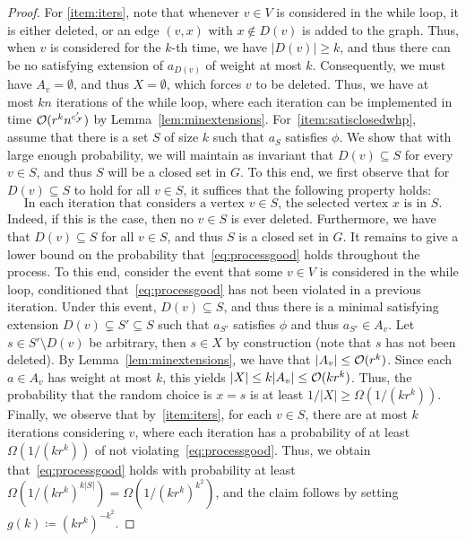 \documentclass[10pt,a4paper]{article}
\theoremstyle{plain}
\newcommand{\Oh}{{\cal O}}
\newcommand{\confam}{\mathcal{F}}
\begin{document}
\begin{proof}
For \ref{item:iters}, note that whenever $v\in V$ is considered in the while loop, it is either deleted, or an edge $(v,x)$ with $x\notin D(v)$ is added to the graph. Thus, when $v$ is considered for the $k$-th time, we have $|D(v)|\ge k$, and thus there can be no satisfying extension of $a_{D(v)}$ of weight at most $k$. Consequently, we must have $A_v=\emptyset$, and thus $X=\emptyset$, which forces $v$ to be deleted. Thus, we have at most $kn$ iterations of the while loop, where each iteration can be implemented in time $\Oh(r^k n^{c'_\confam})$ by Lemma~\ref{lem:minextensions}.
%
For~\ref{item:satisclosedwhp}, assume that there is a set $S$ of size $k$ such that $a_S$ satisfies $\phi$. We show that with large enough probability, we will maintain as invariant that $D(v)\subseteq S$ for every $v\in S$, and thus $S$ will be a closed set in $G$. To this end, we first observe that for $D(v) \subseteq S$ to hold for all $v\in S$, it suffices that the following property holds:
\begin{equation}\label{eq:processgood}
\text{In each iteration that considers a vertex $v\in S$, the selected vertex $x$ is in $S$.}
\end{equation}
Indeed, if this is the case, then no $v\in S$ is ever deleted. Furthermore, we have that $D(v)\subseteq S$ for all $v\in S$, and thus $S$ is a closed set in $G$. It remains to give a lower bound on the probability that~\eqref{eq:processgood} holds throughout the process.
%
To this end, consider the event that some $v\in V$ is considered in the while loop, conditioned that~\eqref{eq:processgood} has not been violated in a previous iteration. Under this event, $D(v) \subseteq S$, and thus there is a minimal satisfying extension $D(v) \subsetneq S' \subseteq S$ such that $a_{S'}$ satisfies $\phi$ and thus $a_{S'}\in A_v$. Let $s\in S'\setminus D(v)$ be arbitrary, then $s\in X$ by construction (note that $s$ has not been deleted). By Lemma~\ref{lem:minextensions}, we have that $|A_v| \le \Oh(r^k)$. Since each $a\in A_v$ has weight at most $k$, this yields $|X|\le k|A_v|\le \Oh(k r^k)$. Thus, the probability that the random choice is $x=s$ is at least $1/|X|\ge \Omega(1/(kr^k))$. Finally, we observe that by~\ref{item:iters}, for each $v\in S$, there are at most $k$ iterations considering $v$, where each iteration has a probability of at least $\Omega(1/(kr^k))$ of not violating~\eqref{eq:processgood}. Thus, we obtain that~\eqref{eq:processgood} holds with probability at least $\Omega(1/(kr^k)^{k|S|}) = \Omega(1/(kr^k)^{k^2})$, and the claim follows by setting $g(k) \coloneqq (kr^k)^{-k^2}$.

\end{proof}
\end{document}
